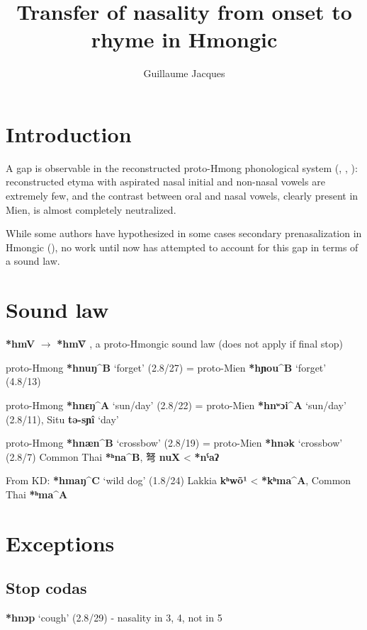 \documentclass[oneside,a4paper,11pt]{article}
\newcommand{\ipa}[1]{\textbf{{\phon\mbox{#1}}}} %
\newcommand{\zh}[1]{{\cn #1}}
\newcommand{\phm}[3]{\ipa{#1} `#2' (#3)}
\begin{document}
\title{Transfer of nasality from onset to rhyme in Hmongic}
\author{Guillaume Jacques}
\maketitle

\section*{Introduction} 
A gap is observable in the reconstructed proto-Hmong phonological system (\citealt{wang94hmong}, \citealt{wang95protomy}, \citealt{ratliff10protohm}): reconstructed etyma with aspirated nasal initial and non-nasal vowels are extremely few, and the contrast between oral and nasal vowels, clearly present in Mien, is almost completely neutralized. 

While some authors have hypothesized in some cases secondary prenasalization in Hmongic (\citealt[57]{ratliff10protohm}), no work until now has attempted to account for this gap in terms of a sound law. 

 
\citet{michaud-jacques12nasalite}

\section{Sound law} 
\ipa{*hmV} $\rightarrow$ \ipa{*hmṼ} , a proto-Hmongic sound law (does not apply if final stop)


\citealt[57]{ratliff10protohm}

proto-Hmong \phm{*hnuŋ^B}{forget}{2.8/27} = proto-Mien \phm{*hɲou^B}{forget}{4.8/13}

proto-Hmong \phm{*hnɛŋ^A}{sun/day}{2.8/22} = proto-Mien \phm{*hnʷɔi^A}{sun/day}{2.8/11}, Situ \ipa{tə-sɲî} `day'

proto-Hmong  \phm{*hnæn^B}{crossbow}{2.8/19} = proto-Mien \phm{*hnək}{crossbow}{2.8/7} 
Common Thai \ipa{*ʰna^B}, \zh{弩} \ipa{nuX} < \ipa{*nˁaʔ}
 
From KD:
\phm{*hmaŋ^C}{wild dog}{1.8/24}
\citet{ferlus96kamsui}
Lakkia \ipa{kʰwõ¹} < \ipa{*kʰma^A}, Common Thai \ipa{*ʰma^A}

  

\section{Exceptions}
\subsection{Stop codas}
\phm{*hnɔp}{cough}{2.8/29} - nasality in 3, 4, not in 5
\end{document}
